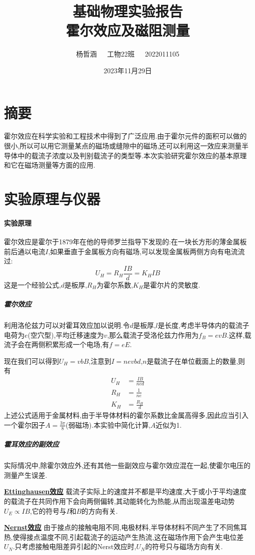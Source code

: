 \documentclass[UTF8,a4paper]{article}%
\title{\textbf{基础物理实验报告\\霍尔效应及磁阻测量}}
\author{杨哲涵~~~工物22班~~~2022011105}
\date{2023年11月29日}
\begin{document}
\maketitle
{}
\chead{}
\lfoot{}
\cfoot{\thepage}
\rfoot{}
\section*{摘要}
霍尔效应在科学实验和工程技术中得到了广泛应用.由于霍尔元件的面积可以做的很小,所以可以用它测量某点的磁场或缝隙中的磁场,还可以利用这一效应来测量半导体中的载流子浓度以及判别载流子的类型等.本次实验研究霍尔效应的基本原理和它在磁场测量等方面的应用.
\section{实验原理与仪器}
\paragraph{实验原理}
霍尔效应是霍尔于1879年在他的导师罗兰指导下发现的:在一块长方形的薄金属板前后通以电流$I$,如果垂直于金属板方向有磁场,可以发现金属板两侧方向有电流流过:
$$U_H=R_H\frac{IB}{d}=K_HIB$$
这是一个经验公式,$d$是板厚,$R_H$为霍尔系数,$K_H$是霍尔片的灵敏度.
\subparagraph{霍尔效应}
利用洛伦兹力可以对霍耳效应加以说明.令$d$是板厚,$l$是长度,考虑半导体内的载流子电荷为$e$(空穴型),平均迁移速度为$v$,那么载流子受洛伦兹力作用为$f_B=evB$.这样,载流子会在两侧积累形成一个电场,有$f=eE$.

现在我们可以得到$U_H=vbB$,注意到$I=nevbd$,$n$是载流子在单位截面上的数量,则有
\begin{align*}
    U_H & =\frac{IB}{ned} \\
    R_H & =\frac{1}{ne}   \\
    K_H & =\frac{R_H}{d}
\end{align*}
上述公式适用于金属材料,由于半导体材料的霍尔系数比金属高得多,因此应当引入一个霍尔因子$A=\frac{3\pi}{8}$(弱磁场).本实验中简化计算,$A$近似为1.
\subparagraph{霍耳效应的副效应}
实际情况中,除霍尔效应外,还有其他一些副效应与霍尔效应混在一起,使霍尔电压的测量产生误差.

\underline{\textbf{Ettinghausen效应}}
载流子实际上的速度并不都是平均速度,大于或小于平均速度的载流子在共同作用下会向两侧偏转,其动能转化为热能,从而出现温差电动势$U_E\propto IB$,它的符号与$I$和$B$的方向有关.

\underline{\textbf{Nernst效应}}
由于接点的接触电阻不同,电极材料,半导体材料不同产生了不同焦耳热,使得接点温度不同,引起载流子的运动产生热流,这在磁场作用下会产生电位差$U_N$.只考虑接触电阻差异引起的Nerst效应时,$U_N$的符号只与磁场方向有关.
\end{document}

